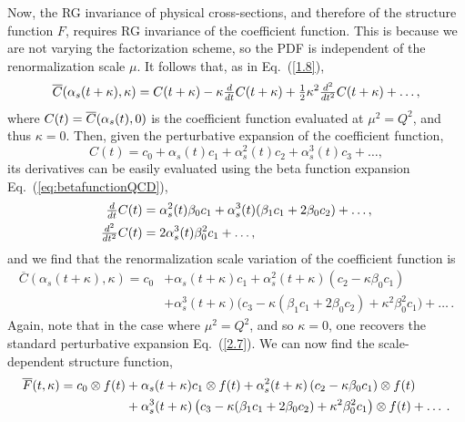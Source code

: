 Now, the RG invariance of physical cross-sections, and therefore
of the structure function $F$, requires RG
invariance of the coefficient function. This is because we are not varying the
factorization scheme, so the PDF is independent of the renormalization scale $\mu$.
%
It follows that, as in Eq.~(\ref{1.8}),
%
\begin{equation}
  \label{2.6}
	\overline{C}(\alpha_s(t + \kappa), \kappa) = C(t + \kappa) - \kappa \hbox{${{d}\over {dt}}$} C(t + \kappa) + \hbox{${{1}\over {2}}$} \kappa^2  \hbox{${{d^2}\over {dt^2}}$} C(t + \kappa)+\ldots,
\end{equation}
where $C(t) = \overline{C}(\alpha_s(t),0)$ is the coefficient function evaluated at 
$\mu^2=Q^2$, and thus $\kappa=0$.
%
Then, given the perturbative expansion of the coefficient function,
%
\begin{equation}
C(t) = c_0 + \alpha_s(t) c_1 + \alpha_s^2(t) c_2 + \alpha_s^3(t) c_3 +\ldots, 
\label{2.7}
\end{equation}
%
its derivatives can be easily evaluated using the beta function expansion
Eq.~(\ref{eq:betafunctionQCD}), 
\begin{equation}
  \label{2.2}
\begin{split}
\hbox{${{d}\over {dt}}$}{C}(t) & = \alpha_s^2(t) \beta_0 c_1+ \alpha_s^3(t) (\beta_1c_1+2\beta_0c_2) + \ldots,\\
\hbox{${{d^2}\over {dt^2}}$}{C}(t) & = 2\alpha_s^3(t) \beta_0^2 c_1+ \ldots,
\end{split}
\end{equation}
%
and we find that the renormalization scale variation of the
coefficient function is 
%
\begin{equation} \label{2.8}
\begin{split}
\overline{C}(\alpha_s(t + \kappa), \kappa) = c_0 &+ \alpha_s(t + \kappa) c_1 + \alpha_s^2(t + \kappa) (c_2 - \kappa \beta_0 c_1)\\ 
&+\alpha_s^3(t + \kappa)\big(c_3-\kappa (\beta_1c_1+2\beta_0c_2)+ \kappa^2 \beta_0^2 c_1\big) + \ldots \, .
\end{split}
\end{equation}
Again, note that in the case where $\mu^2=Q^2$, and so $\kappa=0$, one recovers
the standard perturbative expansion Eq.~(\ref{2.7}).
%
We can now find the scale-dependent structure function,
\begin{equation}
 \label{2.9}
\begin{split}
\overline{F}(t, \kappa) = c_0\otimes f(t) &+ \alpha_s(t + \kappa) c_1\otimes f(t) + \alpha_s^2(t + \kappa)  \left( c_2 - \kappa \beta_0 c_1 \right) \otimes f(t)\\ 
&+\alpha_s^3(t + \kappa) \left( c_3-\kappa (\beta_1c_1+2\beta_0c_2)+ \kappa^2 \beta_0^2 c_1 \right) \otimes f(t) + \ldots\>. 
\end{split}
\end{equation}

